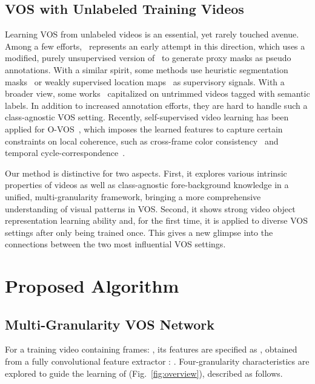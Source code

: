 \documentclass[10pt,twocolumn,letterpaper]{article}
\begin{document}
\vspace{-0pt}
\subsection{VOS with Unlabeled Training Videos}
\label{sec:wvos}
\vspace{-1pt}
Learning VOS from unlabeled videos is an essential, yet rarely touched avenue. Among a few efforts,~\cite{pathak2017learning} represents an early attempt in this direction, which uses a modified, purely unsupervised version of~\cite{DBLP:conf/bmvc/FaktorI14} to generate proxy masks as pseudo annotations. With a similar spirit, some methods use heuristic segmentation masks~\cite{croitoru2017unsupervised} or weakly supervised location maps~\!\cite{Lee2019FrametoFrameAO} as supervisory signals. With a broader view, some works~\!\cite{Tang_2013_CVPR,hartmann2012weakly,Zhang_2017_CVPR} capitalized on untrimmed videos tagged with semantic labels. In addition to increased annotation efforts, they are hard to handle such a class-agnostic VOS setting. Recently, self-supervised video learning has been applied for O-VOS~\!\cite{vondrick2018tracking,CVPR2019_CycleTime}, which imposes the learned features to capture certain constraints on local coherence, such as cross-frame color consistency~\!\cite{vondrick2018tracking} and temporal cycle-correspondence~\!\cite{CVPR2019_CycleTime}.

Our method is distinctive for two aspects. First, it explores various intrinsic properties of videos as well as class-agnostic fore-background knowledge in a unified, multi-granularity framework, bringing a more comprehensive understanding of visual patterns in VOS. Second, it shows strong video object representation learning ability and, for the first time, it is applied to diverse VOS settings after only being trained once. This gives a new glimpse into the connections between the two most influential VOS settings.

\vspace{-2pt}
\section{Proposed Algorithm}
\vspace{-2pt}
\subsection{Multi-Granularity VOS Network}
\vspace{-1pt}
\label{sec:multi-gran-network}
For a training video \bm{} containing  frames: , its features are specified as , obtained from a fully convolutional feature extractor : . Four-granularity
characteristics are explored to guide the learning of  (Fig.~\!\ref{fig:overview}), described as follows.
\end{document}

